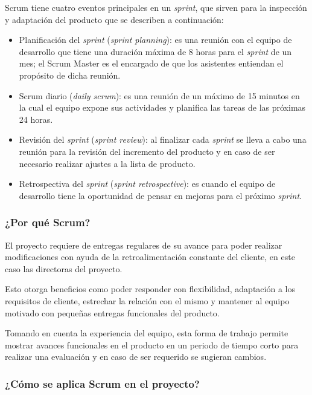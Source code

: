 Scrum tiene cuatro eventos principales en  un \textit{sprint}, que sirven para la inspección y adaptación del producto que se describen a continuación:
\begin{itemize}
	\item Planificación del \textit{sprint} (\textit{sprint planning}): es una reunión con el equipo de desarrollo que tiene una duración máxima de 8 horas para el \textit{sprint} de un mes; el Scrum Master es el encargado de que los asistentes entiendan el propósito de dicha reunión.
	\item Scrum diario (\textit{daily scrum}): es una reunión de un máximo de 15 minutos en la cual el equipo expone sus actividades y planifica las tareas de las próximas 24 horas.
	\item Revisión del \textit{sprint} (\textit{sprint review}): al finalizar cada \textit{sprint} se lleva a cabo una reunión para la revisión del incremento del producto y en caso de ser necesario realizar ajustes a la lista de producto.
	\item Retrospectiva del \textit{sprint} (\textit{sprint retrospective}): es cuando el equipo de desarrollo tiene la oportunidad de pensar en mejoras para el próximo \textit{sprint}.
\end{itemize}

\subsubsection*{¿Por qué Scrum?}
El proyecto requiere de entregas regulares de su avance para poder realizar modificaciones con ayuda de la retroalimentación constante del cliente, en este caso las directoras del proyecto.


Esto otorga beneficios como poder responder con flexibilidad, adaptación a los requisitos de cliente, estrechar la relación con el mismo y mantener al equipo motivado con pequeñas entregas funcionales del producto.


Tomando en cuenta la experiencia del equipo, esta forma de trabajo permite mostrar avances funcionales en el producto en un periodo de tiempo corto para realizar una evaluación y en caso de ser requerido se sugieran cambios.


\subsubsection*{¿Cómo se aplica Scrum en el proyecto?}

